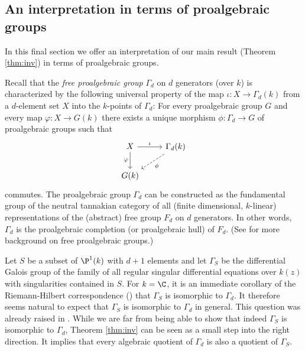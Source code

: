 \documentclass[a4paper, 11pt]{article}
\begin{document}
\subsection{An interpretation in terms of proalgebraic groups}


In this final section we offer an interpretation of our main result (Theorem \ref{thm:inv}) in terms of proalgebraic groups.


Recall that the \emph{free proalgebraic group} $\Gamma_d$ on $d$ generators (over $k$) is characterized by the following universal property of the map $\iota\colon X\to \Gamma_d(k)$ from a $d$-element set $X$ into the $k$-points of $\Gamma_d$: For every proalgebraic group $G$ and every map $\varphi\colon X\to G(k)$ there exists a unique morphism $\phi\colon \Gamma_d\to G$ of proalgebraic groups such that
$$
\begin{tikzcd}  X \arrow[d, "\varphi"'] \arrow{r}{\iota} & \Gamma_d(k) \arrow[ld, dashrightarrow, "\phi"]  \\  G(k)  \end{tikzcd}
$$
commutes. The proalgebraic group $\Gamma_d$ can be constructed as the fundamental group of the neutral tannakian category of all (finite dimensional, $k$-linear) representations of the (abstract) free group $F_d$ on $d$ generators. In other words, $\Gamma_d$ is the proalgebraic completion (or proalgebraic hull) of $F_d$. (See \cite{proalg} for more background on free proalgebraic groups.) 


Let $S$ be a subset of $\P^1(k)$ with $d+1$ elements and let $\Gamma_S$ be the differential Galois group of the family of all regular singular differential equations over $k(z)$ with singularities contained in $S$.
For $k=\C$, it is an immediate corollary of the Riemann-Hilbert correspondence (\cite[Theorem~6.15]{SVDP}) that $\Gamma_S$ is isomorphic to $\Gamma_d$. It therefore seems natural to expect that $\Gamma_S$ is isomorphic to $\Gamma_d$ in general. This question was already raised in \cite[Section~4.1]{Wibmer:RegSing}. While we are far from being able to show that indeed $\Gamma_S$ is isomorphic to $\Gamma_d$, Theorem \ref{thm:inv} can be seen as a small step into the right direction. It implies that every algebraic quotient of $\Gamma_d$ is also a quotient of $\Gamma_S$.



\end{document}
